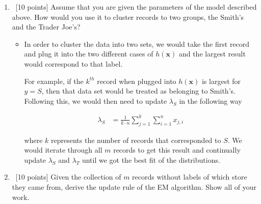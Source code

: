 \begin{enumerate}
\item  ~[10 points] Assume that you are given the parameters of the model described above. How would you use it to cluster records to two groups, the Smith's and the Trader Joe's?

\begin{itemize}
\item In order to cluster the data into two sets, we would take the first record and plug it into the two different cases of $h(\mathbf{x})$ and the largest result would correspond to that label. 

For example, if the $k^{th}$ record when plugged into $h(\mathbf{x})$ is largest for $y=S$, then that data set would be treated as belonging to Smith's. Following this, we would then need to update $\lambda_{S}$ in the following way

\begin{align}
\lambda_{S} &= \frac{1}{k\cdot n}\sum_{j=1}^{k}\sum_{i=1}^{n}x_{j,i}
\end{align}

where $k$ represents the number of records that corresponded to $S$. We would iterate through all $m$ records to get this result and continually update $\lambda_{S}$ and $\lambda_{T}$ until we got the best fit of the distributions.
\end{itemize}


\item  ~[10 points] Given the collection of $m $ records without labels of which store they came from, derive the update rule of the EM algorithm. Show all of your work.


\end{enumerate}
